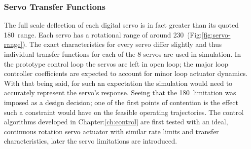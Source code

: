 \subsubsection*{Servo Transfer Functions}
The full scale deflection of each digital servo is in fact greater than its quoted 180\textdegree ~range. Each servo has a rotational range of around 230\textdegree ~(Fig:\ref{fig:servo-range}). The exact characteristics for every servo differ slightly and thus individual transfer functions for each of the 8 servos are used in simulation. In the prototype control loop the servos are left in open loop; the major loop controller coefficients are expected to account for minor loop actuator dynamics. With that being said, for such an expectation the simulation would need to accurately represent the servo's response. Seeing that the 180\textdegree ~limitation was imposed as a design decision; one of the first points of contention is the effect such a constraint would have on the feasible operating trajectories. The control algorithms developed in Chapter:\ref{ch:control} are first tested with an ideal, continuous rotation servo actuator with similar rate limits and transfer characteristics, later the servo limitations are introduced.
